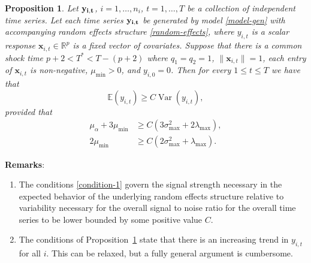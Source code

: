 \documentclass[11pt]{article}
\newcommand{\R}{\mathbb{R}}
\newcommand{\x}{\textbf{x}}
\def\E{\mathbb{E}} %
\DeclareMathOperator{\Var}{Var} %
\newtheorem{prop}{Proposition}
\theoremstyle{definition}
\begin{document}
\begin{prop} \label{prop:signaltonoise}
	Let $\bf{y}_{i,t}$, $i = 1,\ldots,n_i$, $t = 1,\ldots, T$ be a collection of independent time series. Let each time series $\bf{y}_{i,t}$ be generated by model \eqref{model-gen} with accompanying random effects structure \eqref{random-effects}, where $y_{i,t}$ is a scalar response $\x_{i,t} \in \R^p$ is a fixed vector of covariates. Suppose that there is a common shock time $p + 2 < T^* < T - (p+2)$ where $q_1 = q_2 = 1$, $\|\x_{i,t}\| = 1$, each entry of $\x_{i,t}$ is non-negative, $\mu_{\min} > 0$, and $y_{i,0} = 0$. Then for every $1 \leq t \leq T$ we have that 
	\begin{equation} \label{signal-to-noise}
	  \E(y_{i,t}) \geq C\Var(y_{i,t}),	
	\end{equation}
	provided that 
	\begin{equation} \label{condition-1}
	\begin{split}
		\mu_\alpha + 3\mu_{\min} &\geq C\left(3\sigma^2_{\max} + 2\lambda_{\max}\right), \\
		2\mu_{\min} &\geq C\left(2\sigma^2_{\max} + \lambda_{\max}\right).	
	\end{split}
	\end{equation}
\end{prop}


\textbf{Remarks}:
\begin{enumerate}
	\item The conditions \eqref{condition-1} govern the signal strength necessary in the expected behavior of the underlying random effects structure relative to variability necessary for the overall signal to noise ratio for the overall time series to be lower bounded by some positive value $C$.
	\item The conditions of Proposition~\ref{prop:signaltonoise} state that there is an increasing trend in $y_{i,t}$ for all $i$. This can be relaxed, but a fully general argument is cumbersome.
\end{enumerate}
\end{document}

